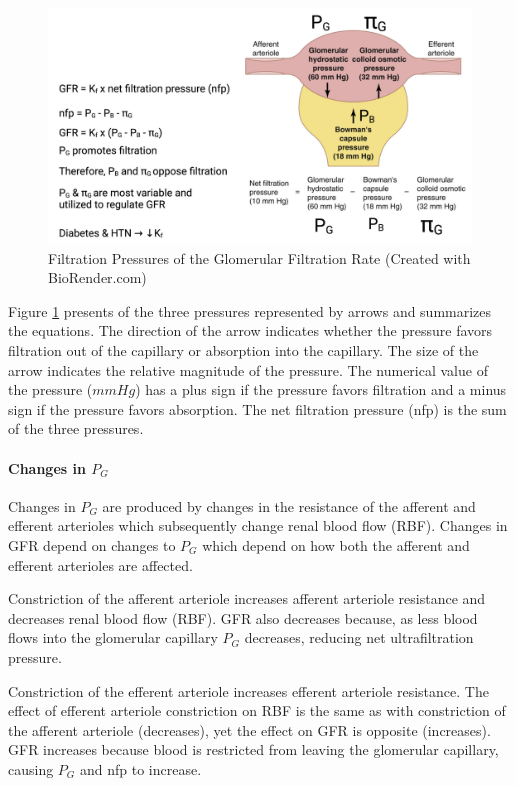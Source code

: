 \begin{figure}[!h]
    \centering
    \includegraphics[width=1\linewidth]{./figure/RBF_GFR.png}
    \caption{Filtration Pressures of the Glomerular Filtration Rate \footnotesize{(Created with BioRender.com)}}
    \label{fig:RBF_GFR}
\end{figure}

Figure \ref{fig:RBF_GFR} presents of the three pressures represented by arrows and summarizes the equations. The direction of the arrow indicates whether the pressure favors filtration out of the capillary or absorption into the capillary. The size of the arrow indicates the relative magnitude of the pressure. The numerical value of the pressure ($mm Hg$) has a plus sign if the pressure favors filtration and a minus sign if the pressure favors absorption. The net filtration pressure (nfp) is the sum of the three pressures.

\paragraph{Changes in $P_{G}$}

Changes in $P_{G}$ are produced by changes in the resistance of the afferent and efferent arterioles which subsequently change renal blood flow (RBF). Changes in GFR depend on changes to $P_{G}$ which depend on how both the afferent and efferent arterioles are affected.

Constriction of the afferent arteriole increases afferent arteriole resistance and decreases renal blood flow (RBF). GFR also decreases because, as less blood flows into the glomerular capillary $P_{G}$ decreases, reducing net ultrafiltration pressure.

Constriction of the efferent arteriole increases efferent arteriole resistance. The effect of efferent arteriole constriction on RBF is the same as with constriction of the afferent arteriole (decreases), yet the effect on GFR is opposite (increases). GFR increases because blood is restricted from leaving the glomerular capillary, causing $P_{G}$ and nfp to increase.

